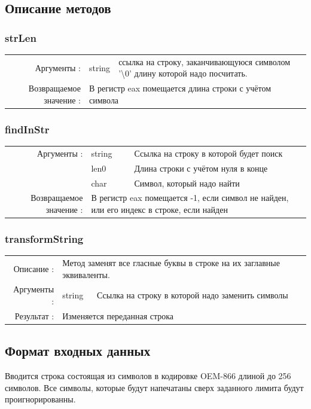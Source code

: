 \documentclass[14pt,a4paper]{article}
\begin{document}
    \subsection{Описание методов}
    \subsubsection{strLen}
    \par{
        \begin{tabular}{rlp{10cm}}
            Аргументы : & string  & ссылка на строку, заканчивающуюся символом '\textbackslash0' длину которой надо посчитать.\\
            Возвращаемое значение : & \multicolumn{2}{p{10cm}}{В регистр eax помещается длина строки с учётом символа}
        \end{tabular}
    }

    \subsubsection{findInStr}{
        \begin{tabular}{rlp{10cm}}
            Аргументы : & string  & Ссылка на строку в которой будет поиск\\
            \hfill & len0  & Длина строки с учётом нуля в конце \\
            \hfill & char & Символ, который надо найти\\
            Возвращаемое значение : & \multicolumn{2}{p{11cm}}{В регистр eax помещается -1, если символ не найден, или его индекс в строке, если найден}
        \end{tabular}
    }

    \subsubsection{transformString}{
        \begin{tabular}{rlp{11cm}}
            Описание : & \multicolumn{2}{p{10cm}}{Метод заменят все гласные буквы в строке на их заглавные эквиваленты.}\\
            Аргументы : & string  & Ссылка на строку в которой надо заменить символы\\
            Результат : & \multicolumn{2}{p{11cm}}{Изменяется переданная строка}
        \end{tabular}
    }

    \subsection{Формат входных данных}\par{
        Вводится строка состоящая из символов в кодировке OEM-866 длиной до 256 символов. Все символы, которые будут напечатаны сверх заданного лимита будут проигнорированны.
    }
\end{document}
